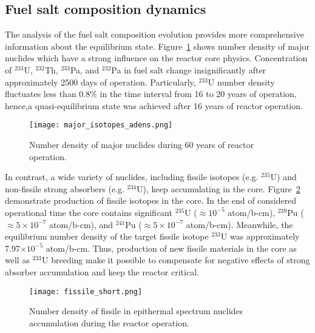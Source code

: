 \subsection{Fuel salt composition dynamics}
The analysis of the fuel salt composition evolution provides more comprehensive information about the equilibrium state. Figure~\ref{fig:adens_eq} shows number density of major nuclides which have a strong influence on the reactor core physics. Concentration of $^{233}$U, $^{232}$Th, $^{233}$Pa, and $^{232}$Pa in fuel salt change insignificantly after approximately 2500 days of operation. Particularly, $^{233}$U number density fluctuates less than 0.8\% in the time interval from 16 to 20 years of operation, hence,a quasi-equilibrium state was achieved after 16 years of reactor operation.
\begin{figure}[ht!] %
  \centering
  \texttt{[image: major\_isotopes\_adens.png]}
  \caption{Number density of major nuclides during 60 years of reactor operation.}
  \label{fig:adens_eq}
\end{figure}
In contrast, a wide variety of nuclides, including fissile isotopes (e.g. $^{235}$U) and non-fissile strong absorbers (e.g. $^{234}$U), keep accumulating in the core. Figure~\ref{fig:fissile_short} demonstrate production of fissile isotopes in the core. In the end of considered operational time the core contains significant $^{235}$U ($\approx10^{-5}$ atom/b-cm), $^{239}$Pu ($\approx5\times10^{-7}$ atom/b-cm), and $^{241}$Pu ($\approx 5\times10^{-7}$ atom/b-cm). Meanwhile, the equilibrium number density of the target fissile isotope $^{233}$U was approximately 7.97$\times10^{-5}$ atom/b-cm. Thus, production of new fissile materials in the core as well as $^{233}$U breeding make it possible to compensate for negative effects of strong absorber accumulation and keep the reactor critical.
\begin{figure}[htp!] %
  \centering
  \texttt{[image: fissile\_short.png]}
  \caption{Number density of fissile in epithermal spectrum nuclides accumulation during the reactor operation.}
  \label{fig:fissile_short}
\end{figure}

